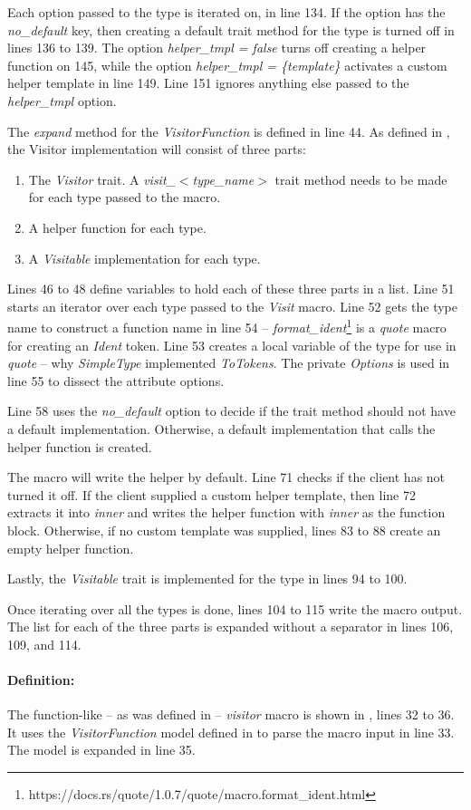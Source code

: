Each option passed to the type is iterated on, in line 134.
If the option has the \textit{no\_default} key, then creating a default trait method for the type is turned off in lines 136 to 139.
The option \textit{helper\_tmpl = false} turns off creating a helper function on 145, while the option \textit{helper\_tmpl = \{template\}} activates a custom helper template in line 149.
Line 151 ignores anything else passed to the \textit{helper\_tmpl} option.

The \textit{expand} method for the \textit{VisitorFunction} is defined in line 44.
As defined in , the Visitor implementation will consist of three parts:

\begin{enumerate}
	\item The \textit{Visitor} trait.
	      A \textit{visit\_$<$type\_name$>$} trait method needs to be made for each type passed to the macro.
	\item A helper function for each type.
	\item A \textit{Visitable} implementation for each type.
\end{enumerate}

Lines 46 to 48 define variables to hold each of these three parts in a list.
Line 51 starts an iterator over each type passed to the \textit{Visit} macro.
Line 52 gets the type name to construct a function name in line 54 -- \textit{format\_ident}\footnote{https://docs.rs/quote/1.0.7/quote/macro.format\_ident.html} is a \textit{quote} macro for creating an \textit{Ident} token.
Line 53 creates a local variable of the type for use in \textit{quote} -- why \textit{SimpleType} implemented \textit{ToTokens}.
The private \textit{Options} is used in line 55 to dissect the attribute options.

Line 58 uses the \textit{no\_default} option to decide if the trait method should not have a default implementation.
Otherwise, a default implementation that calls the helper function is created.

The macro will write the helper by default.
Line 71 checks if the client has not turned it off.
If the client supplied a custom helper template, then line 72 extracts it into \textit{inner} and writes the helper function with \textit{inner} as the function block.
Otherwise, if no custom template was supplied, lines 83 to 88 create an empty helper function.

Lastly, the \textit{Visitable} trait is implemented for the type in lines 94 to 100.

Once iterating over all the types is done, lines 104 to 115 write the macro output.
The list for each of the three parts is expanded without a separator in lines 106, 109, and 114.

\paragraph{Definition:}
The function-like -- as was defined in  -- \textit{visitor} macro is shown in , lines 32 to 36.
It uses the \textit{VisitorFunction} model defined in  to parse the macro input in line 33.
The model is expanded in line 35.